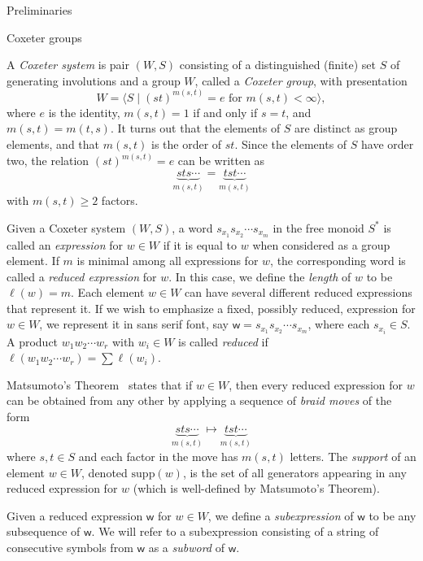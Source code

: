 \documentclass[11pt]{amsart}
\theoremstyle{definition}
\numberwithin{equation}{section}
\newcommand{\supp}{\mathrm{supp}}
\renewcommand{\(}{\left(}
\renewcommand{\)}{\right)}
\newcommand{\w}{\mathsf{w}}
\begin{document}
\begin{section}{Preliminaries}\label{sec:prelim}


\begin{subsection}{Coxeter groups}\label{subsec:coxeter groups}

A \emph{Coxeter system} is pair $(W,S)$ consisting of a distinguished (finite) set $S$ of generating involutions and a group $W$, called a \emph{Coxeter group}, with presentation
\[
W = \langle S \mid (st)^{m(s, t)} = e \text{ for } m(s, t) < \infty \rangle,
\]
where $e$ is the identity, $m(s,t) = 1$ if and only if $s = t$, and $m(s,t) = m(t,s)$. It turns out that the elements of $S$ are distinct as group elements, and that $m(s, t)$ is the order of $st$.  Since the elements of $S$ have order two, the relation $(st)^{m(s,t)} = e$ can be written as
\[
\underbrace{sts \cdots}_{m(s,t)} = \underbrace{tst \cdots}_{m(s,t)}
\]
with $m(s,t) \geq 2$ factors.

Given a Coxeter system $(W,S)$, a word $s_{x_1}s_{x_2}\cdots s_{x_m}$ in the free monoid $S^*$ is called an \emph{expression} for $w\in W$ if it is equal to $w$ when considered as a group element. If $m$ is minimal among all expressions for $w$, the corresponding word is called a \emph{reduced expression} for $w$. In this case, we define the \emph{length} of $w$ to be $\ell(w)=m$. Each element $w \in W$ can have several different reduced expressions that represent it.  If we wish to emphasize a fixed, possibly reduced, expression for $w\in W$, we represent it  in \textsf{sans serif} font, say $\w=s_{x_1}s_{x_2}\cdots s_{x_m}$, where each $s_{x_i} \in S$.  A product $w_{1}w_{2}\cdots w_{r}$ with $w_{i} \in W$ is called \emph{reduced} if $\ell(w_{1}w_{2}\cdots w_{r})=\sum \ell(w_{i})$.  

Matsumoto's Theorem~\cite[Theorem 1.2.2]{Geck2000} states that if $w \in W$, then every reduced expression for $w$ can be obtained from any other by applying a sequence of \emph{braid moves} of the form 
\[
{\underbrace{sts \cdots }_{m(s,t)} } \mapsto {\underbrace{tst \cdots}_{m(s,t)}}
\]
where $s,t \in S$ and each factor in the move has $m(s,t)$ letters.  The \emph{support} of an element $w \in W$, denoted $\supp(w)$, is the set of all generators appearing in any reduced expression for $w$ (which is well-defined by Matsumoto's Theorem).

Given a reduced expression $\w$ for $w \in W$, we define a \emph{subexpression} of $\w$ to be any subsequence of $\w$. We will refer to a subexpression consisting of a string of consecutive symbols from $\w$ as a \emph{subword} of $\w$.


\end{subsection}
\end{section}
\end{document}
